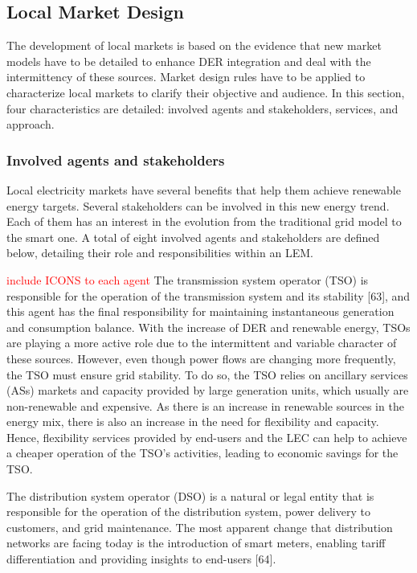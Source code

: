 \subsection{Local Market Design}
The development of local markets is based on the evidence that new market models have to be detailed to enhance DER integration and deal with the intermittency of these sources. Market design rules have to be applied to characterize local markets to clarify their objective and audience. In this section, four characteristics are detailed: involved agents and stakeholders, services, and approach.

\subsubsection{Involved agents and stakeholders}
Local electricity markets have several benefits that help them achieve renewable energy targets. Several stakeholders can be involved in this new energy trend. Each of them has an interest in the evolution from the traditional grid model to the smart one. A total of eight involved agents and stakeholders are defined below, detailing their role and responsibilities within an LEM.

\textcolor{red}{include ICONS to each agent}
The transmission system operator (TSO) is responsible for the operation of the transmission system and its stability [63], and this agent has the final responsibility for maintaining instantaneous generation and consumption balance. With the increase of DER and renewable energy, TSOs are playing a more active role due to the intermittent and variable character of these sources. However, even though power flows are changing more frequently, the TSO must ensure grid stability. To do so, the TSO relies on ancillary services (ASs) markets and capacity provided by large generation units, which usually are non-renewable and expensive. As there is an increase in renewable sources in the energy mix, there is also an increase in the need for flexibility and capacity. Hence, flexibility services provided by end-users and the LEC can help to achieve a cheaper operation of the TSO's activities, leading to economic savings for the TSO.

The distribution system operator (DSO) is a natural or legal entity that is responsible for the operation of the distribution system, power delivery to customers, and grid maintenance. The most apparent change that distribution networks are facing today is the introduction of smart meters, enabling tariff differentiation and providing insights to end-users [64].


